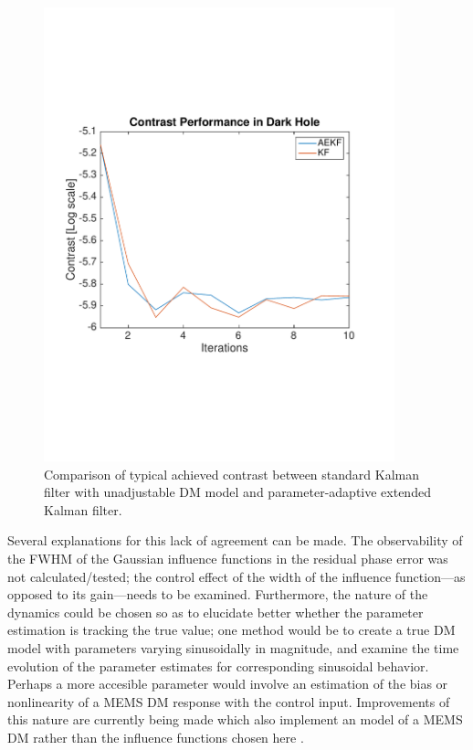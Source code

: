 \documentclass[11pt,reqno]{amsart}
\begin{document}
\begin{figure}[h!]
\centering
\includegraphics[trim = 0.8in 2.5in 0.8in 2.5in, clip, width = 4in]{contrastcompare.pdf}
\caption{Comparison of typical achieved contrast between standard Kalman filter with unadjustable DM model and parameter-adaptive extended Kalman filter.}
\label{fig:contrastcompare}
\end{figure}

Several explanations for this lack of agreement can be made.  The observability of the FWHM of the Gaussian influence functions in the residual phase error was not calculated/tested; the control effect of the width of the influence function---as opposed to its gain---needs to be examined.  Furthermore, the nature of the dynamics could be chosen so as to elucidate better whether the parameter estimation is tracking the true value; one method would be to create a true DM model with parameters varying sinusoidally in magnitude, and examine the time evolution of the parameter estimates for corresponding sinusoidal behavior.  Perhaps a more accesible parameter would involve an estimation of the bias or nonlinearity of a MEMS DM response with the control input.  Improvements of this nature are currently being made which also implement an model of a MEMS DM rather than the influence functions chosen here \cite{Vogel2006}.
\end{document}
